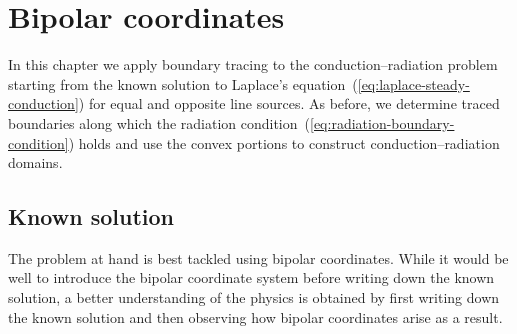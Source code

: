 \chapter{Bipolar coordinates}
\label{ch:bipolar}

In this chapter
we apply boundary tracing to the conduction--radiation problem
starting from the known solution
to Laplace's equation~(\ref{eq:laplace-steady-conduction})
for equal and opposite line sources.
As before,
we determine traced boundaries along which
the radiation condition~(\ref{eq:radiation-boundary-condition}) holds
and use the convex portions to construct conduction--radiation domains.

\section{Known solution}
\label{sec:bipolar.known}

The problem at hand is best tackled using bipolar coordinates.
While it would be well to introduce the bipolar coordinate system
before writing down the known solution,
a better understanding of the physics is obtained
by first writing down the known solution
and then observing how bipolar coordinates arise as a result.

